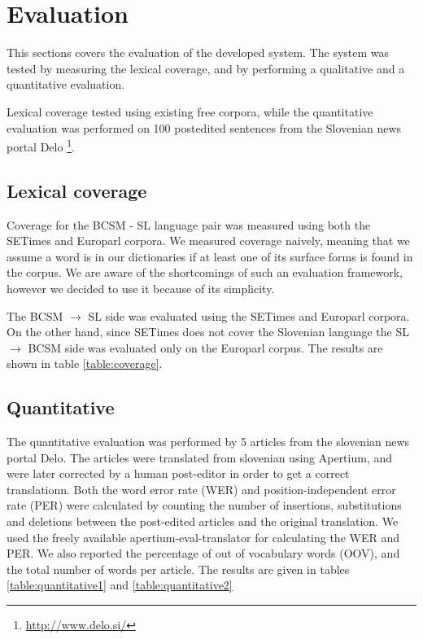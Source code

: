 \section{Evaluation}

This sections covers the evaluation of the developed system. 
The system was tested by measuring the lexical coverage, and by performing
a qualitative and a quantitative evaluation. 

Lexical coverage tested using existing free corpora, 
while the quantitative evaluation was performed on 100 postedited sentences from the Slovenian news portal 
Delo \footnote{\url{http://www.delo.si/}}.


\subsection{Lexical coverage}

Coverage for the BCSM - SL language pair was measured using both the SETimes and Europarl corpora. 
We measured coverage naively, meaning that we assume a word is in our 
dictionaries if at least one of its surface forms is found in the corpus. 
We are aware of the shortcomings of such an evaluation framework, 
however we decided to use it because of its simplicity.

The BCSM $\rightarrow$ SL side was evaluated using the SETimes and Europarl corpora. On the other hand,
since SETimes does not cover the Slovenian language
the SL $\rightarrow$ BCSM side was evaluated only on the Europarl corpus. The results are shown in table \ref{table:coverage}.

\subsection{Quantitative}

The quantitative evaluation was performed by 5 articles
from the slovenian news portal Delo.
The articles were translated from slovenian using Apertium, and were later corrected by a human post-editor in order to get a correct translationn.
Both the word error rate (WER) and position-independent error rate (PER) were calculated
by counting the number of insertions, substitutions and deletions between the post-edited articles
and the original translation. We used the freely available apertium-eval-translator for calculating the WER and PER.
We also reported the percentage of out of vocabulary words (OOV), and the total number of words per article.
The results are given in tables \ref{table:quantitative1} and \ref{table:quantitative2}

